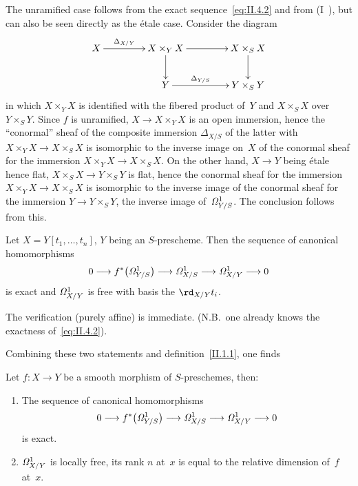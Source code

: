 The unramified case follows from the exact
sequence~\eqref{eq:II.4.2} and from (I~), but can also be
seen directly as the \'etale case. Consider the diagram
\begin{equation*}
\xymatrix@C=1.5cm{
X \ar[r]^-{\Delta_{X/Y}} & X\times_{Y}X \ar[d] \ar[r] &
X\times_{S}X \ar[d] \\ & Y \ar[r]^-{\Delta_{Y/S}} & Y\times_{S}Y
}
\end{equation*}
in which $X\times_{Y}X$ is identified with the fibered product of~$Y$ and
$X\times_{S}X$ over~$Y\times_{S}Y$. Since $f$ is unramified,
$X\to X\times_{Y}X$ is an open immersion, hence the
``conormal'' sheaf of the composite immersion $\Delta_{X/S}$ of the
latter with $X\times_{Y}X\to X\times_{S}X$ is isomorphic to
the inverse image on~$X$ of the conormal sheaf for the immersion
$X\times_{Y}X\to X\times_{S}X$. On the other hand, $X\to Y$ being
\'etale hence flat, $X\times_{S}X\to Y\times_{S}Y$ is flat, hence the
conormal sheaf for the immersion $X\times_{Y}X\to X\times_{S}X$ is
isomorphic to the inverse image of the conormal sheaf for the immersion
$Y\to Y\times_{S}Y$, \ie the inverse image of~$\it{\Omega}^1_{Y/S}$. The
conclusion follows from this.

\begin{lemma}
\label{II.4.2}
Let $X=Y[t_{1},\dots,t_{n}]$, $Y$ being an
$S$-prescheme. Then the sequence of canonical homomorphisms
\[
0\to f^*\big(\it{\Omega}^1_{Y/S}\big)\to
\it{\Omega}^1_{X/S}\to\it{\Omega}^1_{X/Y}\to 0
\]
is exact and $\it{\Omega}^1_{X/Y}$ is free with basis the
$\rd_{X/Y}t_{i}$.
\end{lemma}

The verification (purely affine) is immediate. (N.B.\ one
already knows the exactness of~\eqref{eq:II.4.2}).

Combining these two statements and definition~\ref{II.1.1}, one
finds

\begin{theorem}
\label{II.4.3}
Let $f\colon X\to Y$ be a smooth morphism of $S$-preschemes,
then:
\begin{enumerate}
\item[(i)] The sequence of canonical homomorphisms
\[
0\to f^*\big(\it{\Omega}^1_{Y/S}\big)\to
\it{\Omega}^1_{X/S}\to\it{\Omega}^1_{X/Y}\to 0
\]
is exact.
\item[(ii)] $\it{\Omega}^1_{X/Y}$ is locally free, its rank $n$
at~$x$ is equal to the relative dimension of~$f$ at~$x$.
\end{enumerate}
\end{theorem}

